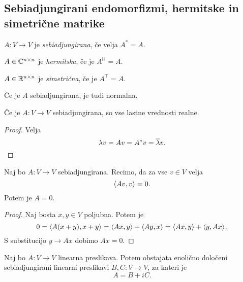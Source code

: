 \documentclass[12pt, a4paper]{article}
\begin{document}
\newpage

\subsection{Sebiadjungirani endomorfizmi, hermitske in simetrične matrike}

\begin{okvir}
\begin{definicija}
$A\colon V\to V$ je \emph{sebiadjungirana}, če velja $A^*=A$.
\end{definicija}

\begin{definicija}
$A\in\mathbb{C}^{n\times n}$ je \emph{hermitska}, če je $A^\mathsf{H}=A$.
\end{definicija}

\begin{definicija}
$A\in\mathbb{R}^{n\times n}$ je \emph{simetrična}, če je $A^\top=A$.
\end{definicija}
\end{okvir}

\begin{opomba}
Če je $A$ sebiadjungirana, je tudi normalna.
\end{opomba}

\begin{trditev}
Če je $A\colon V\to V$ sebiadjungirana, so vse lastne vrednosti realne.
\end{trditev}

\begin{proof}
Velja
\[
\lambda v=Av=A^*v=\overline{\lambda}v.\qedhere
\]
\end{proof}

\begin{trditev}\label{td:sadj}
Naj bo $A\colon V\to V$ sebiadjungirana. Recimo, da za vse $v\in V$ velja
\[
\left\langle Av,v\right\rangle=0.
\]
Potem je $A=0$.
\end{trditev}

\begin{proof}
Naj bosta $x,y\in V$ poljubna. Potem je
\[
0=\left\langle A(x+y),x+y\right\rangle=\left\langle Ax,y\right\rangle+\left\langle Ay,x\right\rangle=\left\langle Ax,y\right\rangle+\left\langle y,Ax\right\rangle.
\]
S substitucijo $y\to Ax$ dobimo $Ax=0$.
\end{proof}

\begin{trditev}
Naj bo $A\colon V\to V$ linearna preslikava. Potem obstajata enolično določeni sebiadjungirani linearni preslikavi $B,C\colon V\to V$, za kateri je
\[
A=B+iC.
\]
\end{trditev}
\end{document}
